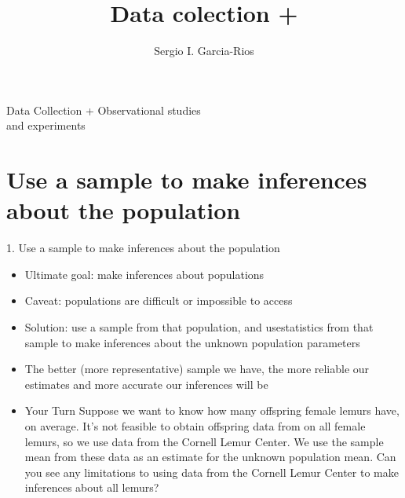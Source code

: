 \documentclass[11pt]{beamer}
\author{Sergio I. Garcia-Rios}
\title{Data colection + }
\institute{Government 3990: Statistics in the Social Science}
\date{}
\begin{document}
\maketitle

\begin{frame}[standout]
\Large{Data Collection + Observational studies \\ and experiments}
\end{frame}


\section{Use a sample to make inferences about the population}
\label{mi1}


\begin{frame}{1. Use a sample to make inferences about the population}
\small{
\begin{itemize}[<+->]
\item Ultimate goal: make inferences about populations
\item Caveat: populations are difficult or impossible to access
\item Solution: use a sample from that population, and use\alert{statistics} from that 
sample to make inferences about the unknown population \alert{parameters}
\item The better (more \alert{representative}) sample we have, the more reliable our 
estimates and more accurate our inferences will be



\item[] \footnotesize{
\begin{exampleblock}{Your Turn}
Suppose we want to know how many offspring female lemurs have, on average.
It's not feasible to obtain offspring data from on all female lemurs, so we use 
data from the Cornell Lemur Center. We use the sample mean from these data as an 
estimate for the unknown population mean. Can you see any limitations to using data 
from the Cornell Lemur Center to make inferences about all lemurs?
\end{exampleblock}
}

\end{itemize}
}
\end{frame}

\end{document}
